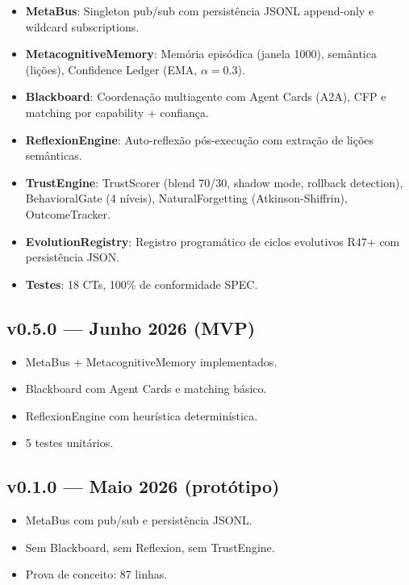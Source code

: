 \begin{itemize}
    \item \textbf{MetaBus}: Singleton pub/sub com persistência JSONL append-only e wildcard subscriptions.
    \item \textbf{MetacognitiveMemory}: Memória episódica (janela 1000), semântica (lições), Confidence Ledger (EMA, $\alpha = 0.3$).
    \item \textbf{Blackboard}: Coordenação multiagente com Agent Cards (A2A), CFP e matching por capability + confiança.
    \item \textbf{ReflexionEngine}: Auto-reflexão pós-execução com extração de lições semânticas.
    \item \textbf{TrustEngine}: TrustScorer (blend 70/30, shadow mode, rollback detection), BehavioralGate (4 níveis), NaturalForgetting (Atkinson-Shiffrin), OutcomeTracker.
    \item \textbf{EvolutionRegistry}: Registro programático de ciclos evolutivos R47+ com persistência JSON.
    \item \textbf{Testes}: 18 CTs, 100\% de conformidade SPEC.
\end{itemize}

\subsection{v0.5.0 — Junho 2026 (MVP)}

\begin{itemize}
    \item MetaBus + MetacognitiveMemory implementados.
    \item Blackboard com Agent Cards e matching básico.
    \item ReflexionEngine com heurística determinística.
    \item 5 testes unitários.
\end{itemize}

\subsection{v0.1.0 — Maio 2026 (protótipo)}

\begin{itemize}
    \item MetaBus com pub/sub e persistência JSONL.
    \item Sem Blackboard, sem Reflexion, sem TrustEngine.
    \item Prova de conceito: 87 linhas.
\end{itemize}


